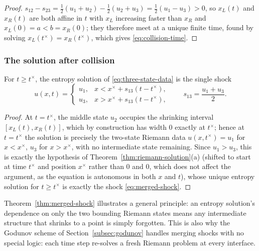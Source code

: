 \begin{proof}
$s_{12}-s_{23} = \tfrac12(u_1+u_2) - \tfrac12(u_2+u_3) = \tfrac12(u_1-u_3)
> 0$, so $x_L(t)$ and $x_R(t)$ are both affine in $t$ with $x_L$
increasing faster than $x_R$ and $x_L(0)=a<b=x_R(0)$; they therefore meet
at a unique finite time, found by solving $x_L(t^\times)=x_R(t^\times)$,
which gives \eqref{eq:collision-time}.
\end{proof}

\subsubsection{The solution after collision}
\label{subsubsec:post-collision}

\begin{theorem}
\label{thm:merged-shock}
For $t \geq t^\times$, the entropy solution of \eqref{eq:three-state-data}
is the single shock
\begin{equation}
  \label{eq:merged-shock}
  u(x,t) = \begin{cases} u_1, & x < x^\times + s_{13}(t-t^\times), \\
                          u_3, & x > x^\times + s_{13}(t-t^\times), \end{cases}
  \qquad s_{13} = \frac{u_1+u_3}{2}.
\end{equation}
\end{theorem}

\begin{proof}
At $t=t^\times$, the middle state $u_2$ occupies the shrinking interval
$[x_L(t), x_R(t)]$, which by construction has width $0$ exactly at
$t^\times$; hence at $t=t^\times$ the solution is precisely the two-state
Riemann data $u(x,t^\times) = u_1$ for $x<x^\times$, $u_3$ for
$x>x^\times$, with no intermediate state remaining. Since $u_1>u_3$, this
is exactly the hypothesis of Theorem~\ref{thm:riemann-solution}(a)
(shifted to start at time $t^\times$ and position $x^\times$ rather than
$0$ and $0$, which does not affect the argument, as the equation is
autonomous in both $x$ and $t$), whose unique entropy solution for
$t\geq t^\times$ is exactly the shock \eqref{eq:merged-shock}.
\end{proof}

\begin{remark}
Theorem~\ref{thm:merged-shock} illustrates a general principle: an
entropy solution's dependence on only the two bounding Riemann states
means any intermediate structure that shrinks to a point is simply
forgotten. This is also why the Godunov scheme of
Section~\ref{subsec:godunov} handles merging shocks with no special
logic: each time step re-solves a fresh Riemann problem at every
interface.
\end{remark}

